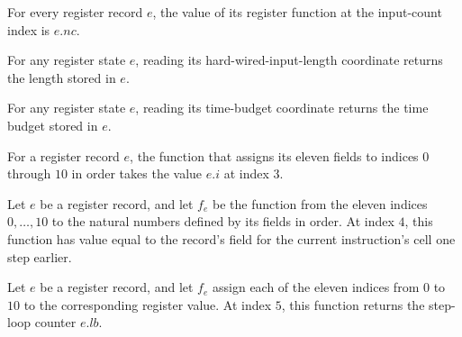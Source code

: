 \begin{theorem}
\label{Complexity.UTab.ER.f_nc}
\leanok
{}
For every register record $e$, the value of its register function at the input-count
index is $e.nc$.
\end{theorem}

\begin{theorem}
\label{Complexity.UTab.ER.f_z}
\leanok
{}
For any register state $e$, reading its hard-wired-input-length coordinate returns the
length stored in $e$.
\end{theorem}

\begin{theorem}
\label{Complexity.UTab.ER.f_t}
\leanok
{}
For any register state $e$, reading its time-budget coordinate returns the time budget
stored in $e$.
\end{theorem}

\begin{theorem}
\label{Complexity.UTab.ER.f_i}
\leanok
{}
For a register record $e$, the function that assigns its eleven fields to indices $0$
through $10$ in order takes the value $e.i$ at index $3$.
\end{theorem}

\begin{theorem}
\label{Complexity.UTab.ER.f_q}
\leanok
{}
Let $e$ be a register record, and let $f_e$ be the function from the eleven indices
$0,\ldots,10$ to the natural numbers defined by its fields in order. At index $4$, this
function has value equal to the record's field for the current instruction's cell one
step earlier.
\end{theorem}

\begin{theorem}
\label{Complexity.UTab.ER.f_lb}
\leanok
{}
Let $e$ be a register record, and let $f_e$ assign each of the eleven indices from $0$
to $10$ to the corresponding register value. At index $5$, this function returns the
step-loop counter $e.lb$.
\end{theorem}


